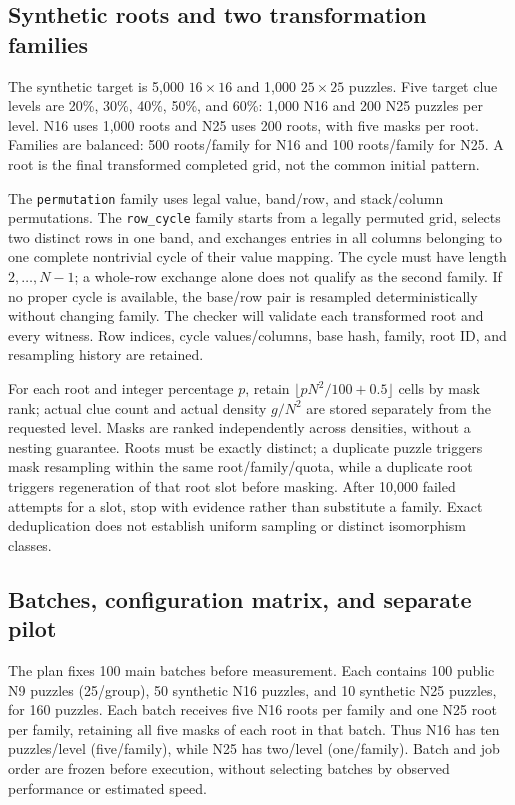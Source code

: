 \subsection{Synthetic roots and two transformation families}
The synthetic target is 5,000 $16\times16$ and 1,000 $25\times25$ puzzles.
Five target clue levels are 20\%, 30\%, 40\%, 50\%, and 60\%: 1,000 N16
and 200 N25 puzzles per level. N16 uses 1,000 roots and N25 uses 200 roots,
with five masks per root. Families are balanced: 500 roots/family for N16 and
100 roots/family for N25. A root is the final transformed completed grid,
not the common initial pattern.

The \texttt{permutation} family uses legal value, band/row, and stack/column
permutations. The \texttt{row\_cycle} family starts from a legally permuted
grid, selects two distinct rows in one band, and exchanges entries in all
columns belonging to one complete nontrivial cycle of their value mapping.
The cycle must have length $2,\ldots,N-1$; a whole-row exchange alone does not
qualify as the second family. If no proper cycle is available, the base/row
pair is resampled deterministically without changing family. The checker will
validate each transformed root and every witness. Row indices, cycle
values/columns, base hash, family, root ID, and resampling history are retained.

For each root and integer percentage $p$, retain
$\lfloor pN^2/100+0.5\rfloor$ cells by mask rank; actual clue count and actual
density $g/N^2$ are stored separately from the requested level. Masks are
ranked independently across densities, without a nesting guarantee. Roots
must be exactly distinct; a duplicate puzzle triggers mask resampling within
the same root/family/quota, while a duplicate root triggers regeneration of
that root slot before masking. After 10,000 failed attempts for a slot, stop
with evidence rather than substitute a family. Exact deduplication does not
establish uniform sampling or distinct isomorphism classes.

\subsection{Batches, configuration matrix, and separate pilot}
The plan fixes 100 main batches before measurement. Each contains 100 public
N9 puzzles (25/group), 50 synthetic N16 puzzles, and 10 synthetic N25 puzzles,
for 160 puzzles. Each batch receives five N16 roots per family and one N25
root per family, retaining all five masks of each root in that batch. Thus
N16 has ten puzzles/level (five/family), while N25 has two/level (one/family).
Batch and job order are frozen before execution, without selecting batches
by observed performance or estimated speed.

